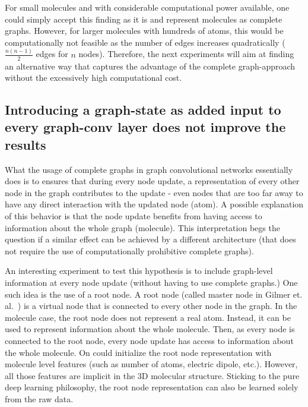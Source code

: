 For small molecules and with considerable computational power available, one could simply accept this finding as it is and represent molecules as complete graphs. However, for larger molecules with hundreds of atoms, this would be computationally not feasible as the number of edges increases quadratically ($\frac{n(n - 1)}{2}$ edges for $n$ nodes). Therefore, the next experiments will aim at finding an alternative way that captures the advantage of the complete graph-approach without the excessively high computational cost.



\subsection{Introducing a graph-state as added input to every graph-conv layer does not improve the results}
\label{sec:root-node}


What the usage of complete graphs in graph convolutional networks essentially does is to ensures that during every node update, a representation of every other node in the graph contributes to the update - even nodes that are too far away to have any direct interaction with the updated node (atom).
A possible explanation of this behavior is that the node update benefits from having access to information about the whole graph (molecule). This interpretation begs the question if a similar effect can be achieved by a different architecture (that does not require the use of computationally prohibitive complete graphs).

An interesting experiment to test this hypothesis is to include graph-level information at every node update (without having to use complete graphs.) One such idea is the use of a root node. A root node (called master node in Gilmer et. al.~\cite{Gilmer2017}) is a virtual node that is connected to every other node in the graph. In the molecule case, the root node does not represent a real atom. Instead, it can be used to represent information about the whole molecule. Then, as every node is connected to the root node, every node update has access to information about the whole molecule. On could initialize the root node representation with molecule level features (such as number of atoms, electric dipole, etc.). However, all those features are implicit in the 3D molecular structure. Sticking to the pure deep learning philosophy, the root node representation can also be learned solely from the raw data.

